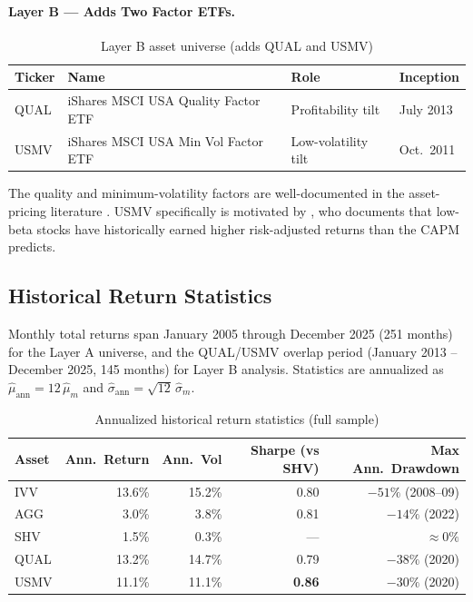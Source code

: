 \documentclass[12pt, letterpaper]{article}
\begin{document}
\paragraph{Layer B --- Adds Two Factor ETFs.}
\begin{table}[H]
  \centering
  \caption{Layer B asset universe (adds QUAL and USMV)}
  \label{tab:layer_b}
  \begin{tabularx}{\linewidth}{llXl}
    \toprule
    \textbf{Ticker} & \textbf{Name} & \textbf{Role} & \textbf{Inception} \\
    \midrule
    QUAL & iShares MSCI USA Quality Factor ETF  & Profitability tilt  & July 2013 \\
    USMV & iShares MSCI USA Min Vol Factor ETF  & Low-volatility tilt & Oct.\ 2011 \\
    \bottomrule
  \end{tabularx}
\end{table}

The quality and minimum-volatility factors are well-documented in the asset-pricing
literature \citep{novy2013,baker2011}.  USMV specifically is motivated by
\citet{ang2016}, who documents that low-beta stocks have historically earned
higher risk-adjusted returns than the CAPM predicts.

\subsection{Historical Return Statistics}

Monthly total returns span January 2005 through December 2025 (251 months) for
the Layer A universe, and the QUAL/USMV overlap period (January 2013 -- December 2025,
145 months) for Layer B analysis.  Statistics are annualized as
$\hat{\mu}_{\text{ann}} = 12\,\hat{\mu}_m$ and $\hat{\sigma}_{\text{ann}} = \sqrt{12}\,\hat{\sigma}_m$.

\begin{table}[H]
  \centering
  \caption{Annualized historical return statistics (full sample)}
  \label{tab:stats}
  \begin{tabular}{lrrrr}
    \toprule
    \textbf{Asset} & \textbf{Ann.\ Return} & \textbf{Ann.\ Vol}
                   & \textbf{Sharpe (vs SHV)} & \textbf{Max Ann.\ Drawdown} \\
    \midrule
    IVV  & 13.6\% & 15.2\% & 0.80 & $-51\%$ (2008--09) \\
    AGG  &  3.0\% &  3.8\% & 0.81 & $-14\%$ (2022) \\
    SHV  &  1.5\% &  0.3\% & ---  & $\approx 0\%$ \\
    QUAL & 13.2\% & 14.7\% & 0.79 & $-38\%$ (2020) \\
    USMV & 11.1\% & 11.1\% & \textbf{0.86} & $-30\%$ (2020) \\
    \bottomrule
  \end{tabular}
\end{table}
\end{document}
